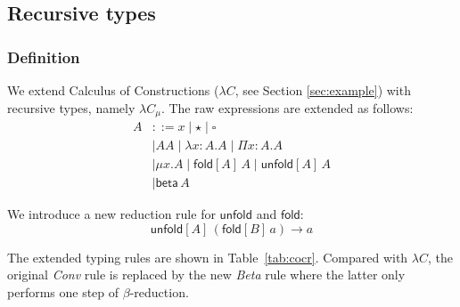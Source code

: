 \documentclass[oneside,a4paper]{article}
\theoremstyle{break}
\newcommand{\fold}[2]{\mathsf{fold}[#1]\,#2}
\newcommand{\unfold}[2]{\mathsf{unfold}[#1]\,#2}
\newcommand{\betaa}[1]{\mathsf{beta}\,#1}
\begin{document}
\begin{comment}
    (Conv) &
             \AxiomC{$\Gamma \vdash_{c} a:A$}
             \AxiomC{$\Gamma \vdash_{c} B:s$}
             \AxiomC{$A=_{\beta c} B$}
             \TrinaryInfC{$\Gamma \vdash_{c} a:B$}
             \DisplayProof
  \end{tabular}
\end{table}
the $(Conv)$ rule is extended with reduction of case expressions.

In the $(Case)$ rule, the first premise binds the actual type
constructor arguments to $\vec{\mathbf{u^{\prime}}}$. The second
premise derives the types of the data constructor arguments
$\vec{\mathbf{t}}_j$ and binds them to $\vec{\mathbf{\alpha}}_{j}$,
using the data constructor $K_{j}$ and the actual type constructor
arguments. The third premise checks whether the types of the right
hand sides, instantiated to the actual type constructor arguments, are
equal, and if so the result type is bound to $t$. Finally, the forth
premise checks whether the derived type $t$ is well formed.

\end{comment}

\subsection{Recursive types}

\subsubsection{Definition}
We extend Calculus of Constructions ($\lambda C$, see Section
\ref{sec:example}) with recursive types, namely $\lambda C_{\mu}$.
The raw expressions are extended as follows:
\begin{align*}
  A &::= x \mid \star \mid \square \\
    &\mid AA \mid \lambda x:A.A \mid \Pi x:A.A \\
    & \mid \mu x.A \mid \fold{A}{A} \mid \unfold{A}{A} \\
    & \mid \betaa{A}
\end{align*}

We introduce a new reduction rule for $\mathsf{unfold}$ and
$\mathsf{fold}$:
\[\unfold{A}{(\fold{B}{a})} \to a\]

The extended typing rules are shown in Table~\ref{tab:cocr}. Compared
with $\lambda C$, the original \emph{Conv} rule is replaced by the new
\emph{Beta} rule where the latter only performs one step of
$\beta$-reduction.
\end{document}
